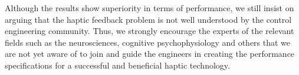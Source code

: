 Although the results show superiority in terms of performance, we still insist on arguing that the haptic feedback problem is not well 
understood by the control engineering community. Thus, we strongly encourage the experts of the relevant fields such as the neurosciences, 
cognitive psychophysiology and others that we are not yet aware of to join and guide the engineers in creating the performance 
specifications for a successful and beneficial haptic technology.
%
%
%
